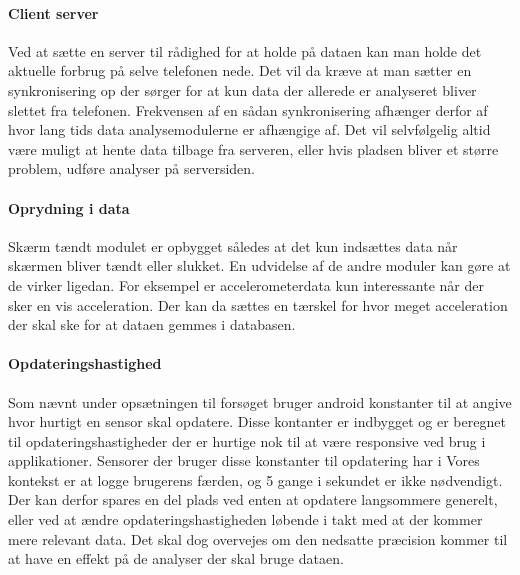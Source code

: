 \paragraph{Client server}
Ved at sætte en server til rådighed for at holde på dataen kan man holde det aktuelle forbrug på selve telefonen nede.
Det vil da kræve at man sætter en synkronisering op der sørger for at kun data der allerede er analyseret bliver slettet fra telefonen. 
Frekvensen af en sådan synkronisering afhænger derfor af hvor lang tids data analysemodulerne er afhængige af.
Det vil selvfølgelig altid være muligt at hente data tilbage fra serveren, eller hvis pladsen bliver et større problem, udføre analyser på serversiden.

\paragraph{Oprydning i data}
Skærm tændt modulet er opbygget således at det kun indsættes data når skærmen bliver tændt eller slukket.
En udvidelse af de andre moduler kan gøre at de virker ligedan. 
For eksempel er accelerometerdata kun interessante når der sker en vis acceleration.
Der kan da sættes en tærskel for hvor meget acceleration der skal ske for at dataen gemmes i databasen.

\paragraph{Opdateringshastighed}
Som nævnt under opsætningen til forsøget bruger android konstanter til at angive hvor hurtigt en sensor skal opdatere.
Disse kontanter er indbygget og er beregnet til opdateringshastigheder der er hurtige nok til at være responsive ved brug i applikationer.
Sensorer der bruger disse konstanter til opdatering har i 
Vores kontekst er at logge brugerens færden, og 5 gange i sekundet er ikke nødvendigt.
Der kan derfor spares en del plads ved enten at opdatere langsommere generelt, eller ved at ændre opdateringshastigheden løbende i takt med at der kommer mere relevant data.
Det skal dog overvejes om den nedsatte præcision kommer til at have en effekt på de analyser der skal bruge dataen.